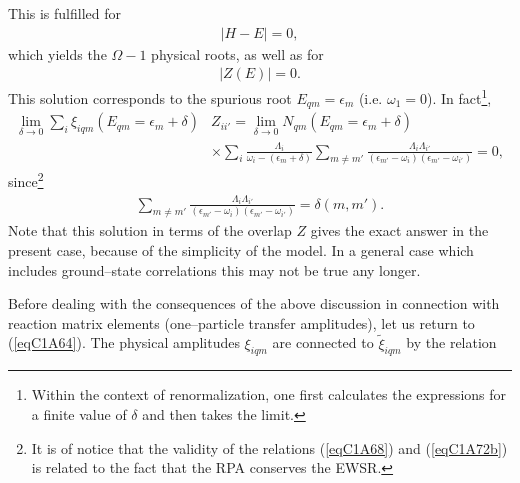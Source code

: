 This is fulfilled for 
\begin{align}\label{eqC1A70} 
 \left|H-E\right|=0,
  \end{align}
  which yields the $\Omega-1$ physical roots, as well as for 
\begin{align}\label{eqC1A71} 
 |Z(E)|=0.
  \end{align}
This solution corresponds to the spurious root $E_{qm}=\epsilon_m$ 
(i.e. $\omega_1=0$). In fact\footnote{Within the context of renormalization, one first calculates the expressions  for a finite value of $\delta$ and then takes the limit.}, 
\begin{align}\label{eqC1A72} 
\nonumber \lim_{\delta\rightarrow0}\sum_i\xi_{iqm}(E_{qm}=\epsilon_m+\delta)&Z_{ii'}=\lim_{\delta\rightarrow0}N_{qm}(E_{qm}=\epsilon_m+\delta)\\
 &\times\sum_i\frac{\Lambda_i}{\omega_i-(\epsilon_m+\delta)}\sum_{m\neq m'}\frac{\Lambda_i\Lambda_{i'}}{(\epsilon_{m'}-\omega_i)(\epsilon_{m'}-\omega_{i'})}=0,
  \end{align}
  since\footnote{It is of notice that the validity of the relations (\ref{eqC1A68}) and (\ref{eqC1A72b}) is related to the fact that the RPA conserves the EWSR.}
  \begin{align}\label{eqC1A72b} 
  \sum_{m\neq m'}\frac{\Lambda_i\Lambda_{i'}}{(\epsilon_{m'}-\omega_i)(\epsilon_{m'}-\omega_{i'})}=\delta(m,m').
    \end{align} 
Note that this solution in terms of the overlap $Z$ gives the exact answer in the present case, because of the simplicity of the model. In a general case which includes ground--state correlations this may not be true any longer. 


Before dealing with the consequences of the above discussion in connection with reaction matrix elements (one--particle transfer amplitudes), let us return to (\ref{eqC1A64}).
The physical amplitudes $\xi_{iqm}$ are connected to $\tilde \xi_{iqm}$ by the relation

